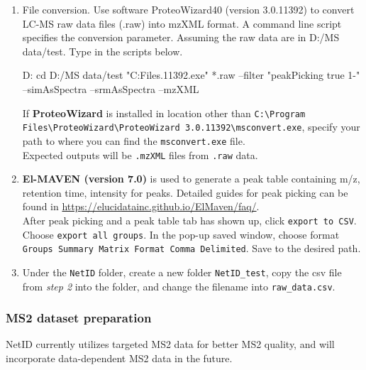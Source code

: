 \documentclass[]{article}
\renewenvironment{verbatim}{\color{codecolor}\begin{myshaded}\begin{oldverbatim}}{\end{oldverbatim}\end{myshaded}}
\begin{document}
\begin{enumerate}
\def\labelenumi{\arabic{enumi}.}
\item
  File conversion. Use software ProteoWizard40 (version 3.0.11392) to convert LC-MS raw data files (.raw) into mzXML format. A command line script specifies the conversion parameter. Assuming the raw data are in D:/MS data/test. Type in the scripts below.

\begin{verbatim}
D:
cd D:/MS data/test
"C:\Program Files\ProteoWizard{}.11392\msconvert.exe" *.raw --filter "peakPicking true 1-" --simAsSpectra --srmAsSpectra --mzXML 
\end{verbatim}

  If \textbf{ProteoWizard} is installed in location other than \texttt{C:\textbackslash{}Program Files\textbackslash{}ProteoWizard\textbackslash{}ProteoWizard 3.0.11392\textbackslash{}msconvert.exe}, specify your path to where you can find the \texttt{msconvert.exe} file.\\
  Expected outputs will be \texttt{.mzXML} files from \texttt{.raw} data.
\item
  \textbf{El-MAVEN (version 7.0)} is used to generate a peak table containing m/z, retention time, intensity for peaks. Detailed guides for peak picking can be found in \url{https://elucidatainc.github.io/ElMaven/faq/}.\\
  After peak picking and a peak table tab has shown up, click \texttt{export to CSV}. Choose \texttt{export all groups}. In the pop-up saved window, choose format \texttt{Groups Summary Matrix Format Comma Delimited}. Save to the desired path.
\item
  Under the \texttt{NetID} folder, create a new folder \texttt{NetID\_test}, copy the csv file from \emph{step 2} into the folder, and change the filename into \texttt{raw\_data.csv}.
\end{enumerate}

\hypertarget{ms2-dataset-preparation}{%
\subsubsection{MS2 dataset preparation}\label{ms2-dataset-preparation}}

NetID currently utilizes targeted MS2 data for better MS2 quality, and will incorporate data-dependent MS2 data in the future.
\end{document}
